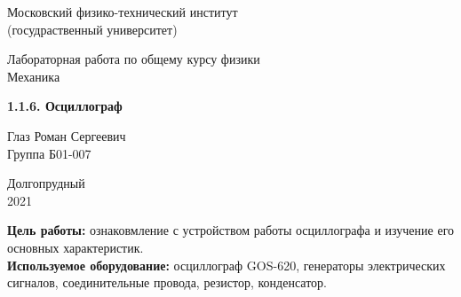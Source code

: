\documentclass[a4paper, 12pt]{article} %
\begin{document}


\begin{titlepage}

    \newpage
    \begin{center}
        \normalsize Московский физико-технический институт \\(госудраственный университет)
    \end{center}

    \vspace{6em}

    \begin{center}
        \Large Лабораторная работа по общему курсу физики\\Механика
    \end{center}

    \vspace{1em}

    \begin{center}
        \Large \textbf{1.1.6. Осциллограф}
    \end{center}

    \vspace{2em}

    \begin{center}
        \large Глаз Роман Сергеевич \\
        Группа Б01-007
    \end{center}

    \vspace{\fill}

    \begin{center}
        Долгопрудный \\2021
    \end{center}
    
\end{titlepage}



    \thispagestyle{empty}
    \newpage
    \tableofcontents
    \newpage
    \setcounter{page}{1}

\textbf{Цель работы:} ознаковмление с устройством работы осциллографа и изучение его основных характеристик.\\

\textbf{Используемое оборудование:} осциллограф GOS-620, генераторы электрических сигналов, соединительные провода, резистор, конденсатор.
\end{document}
